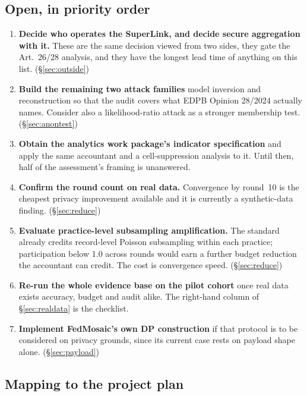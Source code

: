 \subsection*{Open, in priority order}

\begin{enumerate}[start=6]
  \item \textbf{Decide who operates the SuperLink, and decide secure aggregation with it.} These are
        the same decision viewed from two sides, they gate the Art.~26/28 analysis, and they have the
        longest lead time of anything on this list. (\S\ref{sec:outside})
  \item \textbf{Build the remaining two attack families} model inversion and reconstruction
        so that the audit covers what EDPB Opinion 28/2024 actually names. Consider also a
        likelihood-ratio attack as a stronger membership test. (\S\ref{sec:anontest})
  \item \textbf{Obtain the analytics work package's indicator specification} and apply the same
        accountant and a cell-suppression analysis to it. Until then, half of the assessment's
        framing is unanswered.
  \item \textbf{Confirm the round count on real data.} Convergence by round~10 is the cheapest
        privacy improvement available and it is currently a synthetic-data finding.
        (\S\ref{sec:reduce})
  \item \textbf{Evaluate practice-level subsampling amplification.} The standard already credits
        record-level Poisson subsampling within each practice; participation below 1.0 across
        rounds would earn a further budget reduction the accountant can credit. The cost is
        convergence speed. (\S\ref{sec:reduce})
  \item \textbf{Re-run the whole evidence base on the pilot cohort} once real data exists
        accuracy, budget and audit alike. The right-hand column of \S\ref{sec:realdata} is the
        checklist.
  \item \textbf{Implement FedMosaic's own DP construction} if that protocol is to be considered on
        privacy grounds, since its current case rests on payload shape alone. (\S\ref{sec:payload})
\end{enumerate}

\subsection*{Mapping to the project plan}

